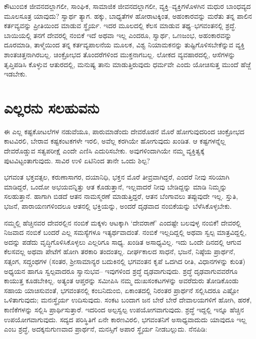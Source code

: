 ಕೌಟುಂಬಿಕ ಜೀವನದಲ್ಲಾಗಲೀ, ಸಾಂಘಿಕ, ಸಾಮಾಜಿಕ ಜೀವನದಲ್ಲಾಗಲೀ, ವ್ಯಕ್ತಿ–ವ್ಯಕ್ತಿಗ\-ಳೊಳಗಿನ ಮಧುರ ಬಾಂಧವ್ಯದ ಮೂಲಸೂತ್ರ ಯಾವುದು? ಸ್ವಾರ್ಥ ತ್ಯಾಗ. ಹಕ್ಕು, ಬಾಧ್ಯತೆಗಳ ಹೋರಾಟಕ್ಕಿಂತ, ಅಹಂಕಾರವನ್ನು ಮರೆತು ತನ್ನ ಪಾಲಿನ ಕರ್ತವ್ಯವನ್ನು ಪ್ರೀತಿಯಿಂದ ಮಾಡುವ ಸ್ಥೈರ್ಯ. ಇದರ ಮೂಲದಲ್ಲಿ ಕೆಲಸ ಮಾಡುವ ತಥ್ಯ–ಭಗವಂತನಲ್ಲಿ ಶ್ರದ್ಧೆ. ಬಾಯಿಯಲ್ಲಿ ತನಗೆ ದೇವರಲ್ಲಿ ನಂಬಿಕೆ ಇದೆ ಅಥವಾ ಇಲ್ಲ ಎಂದರೂ, ಸ್ವಾರ್ಥ, ಒಣಜಂಭ, ಅಹಂಕಾರವನ್ನು ದೂರಮಾಡಿ, ತಾಳ್ಮೆಯಿಂದ ತನ್ನ ಕರ್ತವ್ಯಪಾಲನೆಯ ಮೂಲಕ, ವಿಶ್ವ ನಿಯಾಮಕನನ್ನು ತುಷ್ಟಿಗೊಳಿಸಬೇಕೆನ್ನುವ ವ್ಯಕ್ತಿ ಶಾಂತಚಿತ್ತನಾಗಿರಬಲ್ಲ. ಚಿಂಕ್ರೋಭದ ತೊಂದರೆಗಳಿಂದ ಮುಕ್ತನಾಗಬಲ್ಲ. ಲೋಕದ ವ್ಯವಹಾರದಲ್ಲಿ, ಆಸೆಗಳನ್ನು ತೃಪ್ತಿಪಡಿಸಿ ಕೊಳ್ಳುವ ಆತುರದಲ್ಲಿ, ಮನುಷ್ಯ ತಾನು ಮಾಡುತ್ತಿರುವುದು ಧರ್ಮವೇ ಎಂದು ಯೋಚಿಸುತ್ತ ಮುಂದೆ ಹೆಜ್ಜೆ ಇಡಬೇಕು.


\section*{ಎಲ್ಲರನು ಸಲಹುವನು}

\vskip -7pt

ಈ ಎಲ್ಲ ಕಷ್ಟಕೋಟಲೆಗಳ ನಡುವೆಯೂ, ಪಾರುಮಾಡೆಂದು ದೇವರೊಡನೆ ಮೊರೆ ಹೋಗುವುದರಿಂದ ಚಿಂಕ್ರೋಭದ ಕಾಟವಿರಲಿ, ಬೇರಾವ ಕಷ್ಟಕಂಟಕಗಳೇ ಇರಲಿ, ಅವೆಲ್ಲ ಕರಗಿಯೇ ಹೋಗುವುದು ಖಂಡಿತ. ಆ ಕಷ್ಟಗಳನ್ನೆಲ್ಲ ದೇವರೊಡ್ಡುವ ಸತ್ವಪರೀಕ್ಷೆ ಎಂದೇ ಎಣಿಸಿ ಎದುರಿಸಬೇಕು. ಅವುಗಳಿಂದಾಗಿಯೇ ನಮ್ಮ ವ್ಯಕ್ತಿತ್ವಕ್ಕೆ ಪುಟವಿಟ್ಟಂತಾಗುವುದು. ಸಾವಿರ ಉಳಿ ಏಟಿನಿಂದ ತಾನೇ ಒಂದು ಶಿಲ್ಪ?

ಭಗವಂತ ಭಕ್ತವತ್ಸಲ, ಕರುಣಾಸಾಗರ, ದಯಾನಿಧಿ, ಭಕ್ತನ ಮೊರೆ ತೀವ್ರವಾಗಿದ್ದರೆ, ಎಂದರೆ ನೀವು ಸರಿಯಾಗಿ  ಮಾಡಿದ್ದರೆ, ಒಂದೋ ಅಭಯವನ್ನಿತ್ತು ಆತ  ಕೊಡುತ್ತಾನೆ, ಇಲ್ಲವಾದರೆ ನೀವು ಬೇಡಿದ್ದನ್ನು  ಮಾಡಿ ನಿಮ್ಮನ್ನು ಸಲಹುತ್ತಾನೆ. ಹಾಗಾಗಿ ಬಿಡದೆ ಆತನ ನಾಮಸ್ಮರಣೆ ಮಾಡುತ್ತಿದ್ದರೆ, ಆತನ ಬೆಂಗಾವಲು ತಪ್ಪುವುದೇ ಇಲ್ಲ. ಸ್ತುತಿ, ಭಜನೆ, ಪಾರಾಯಣಗಳಿಂದಲೂ ಆತನಲ್ಲಿ ಭಕ್ತಿಯನ್ನು, ಅಂದರೆ ದೃಢವಾದ ನಂಬಿಕೆಯನ್ನು ಬೆಳೆಸಿಕೊಳ್ಳಬೇಕು.

ನಮ್ಮಲ್ಲಿ ಹೆಚ್ಚಿನವರ ದೇವರಲ್ಲಿನ ನಂಬಿಕೆ ಮಕ್ಕಳು ಆಟಕ್ಕಾಗಿ ‘ದೇವರಾಣೆ’ ಎಂದಷ್ಟೇ ಬಲವುಳ್ಳ ನಂಬಿಕೆ! ದೇವರಲ್ಲಿ ನಿಜವಾದ ನಂಬಿಕೆ ಬಂದರೆ ಎಲ್ಲ ಸಮಸ್ಯೆಗಳೂ ಇತ್ಯರ್ಥ\-ವಾದಂತೆ. ನಂಬಿಕೆ ಇಲ್ಲದಿದ್ದಲ್ಲಿ ಅಥವಾ ಸ್ವಲ್ಪ ಮಾತ್ರವಿದ್ದಲ್ಲಿ, ಅದನ್ನು ಪಡೆದು ವೃದ್ಧಿಗೊಳಿಸಿಕೊಳ್ಳಲು ಎಲ್ಲರಿಗೂ ಸಾಧ್ಯ. ಖಂಡಿತ ಅಸಾಧ್ಯವಿಲ್ಲ. ಇದು ಒಂದೇ ದಿನದಲ್ಲಿ ಆಗುವ ಕೆಲಸವಲ್ಲ ಅಥವಾ ಪೇಟೆಗೆ ಹೋಗಿ ತರಕಾರಿ ತಂದಂತಲ್ಲ. ದೀರ್ಘಕಾಲದ ಸಾಧನೆ, ಭಜನೆ, ನಿಷ್ಠೆಯ ಪ್ರಾರ್ಥನೆ, ಸತ್ಸಂಗ, ಸದ್ಗ್ರಂಥಗಳ (ಸಂತರ, ಶ‍್ರೀಸಾಮಾನ್ಯರ ಬದುಕಿನಲ್ಲಿ ಭಗವಂತನ ಕೃಪೆ ಒದಗಿದ ರೀತಿ, ವಿಧಾನಗಳನ್ನು ಕುರಿತ) ಅಧ್ಯಯನ ಹಾಗೂ ಸ್ವಲ್ಪವಾದರೂ ಸ್ವಾನುಭವ– ಇವುಗಳಿಂದ ಶ್ರದ್ಧೆ ದೃಢವಾಗುವುದು. ಶ್ರದ್ಧೆ ದೃಢವಾಗುವವರೆಗೂ ಕಾಯುತ್ತ ಕೂಡಬೇಕಿಲ್ಲ. ಅತ್ಯಂತ ಆಪ್ತರನ್ನು ಸಮೀಪಿಸಿ ನಮ್ಮ ದುಃಖಸಂಕಟಗಳನ್ನು ಅವರೆದುರು ತೋಡಿಕೊಂಡು ಸಹಾಯ ಯಾಚಿಸುವಂತೆ, ಭಗವಂತನಲ್ಲಿ ಕಂಬನಿದುಂಬಿ, ಏಕಾಂತದಲ್ಲಿ ನಿರಂತರ ಪ್ರಾರ್ಥನೆ ಸಲ್ಲಿಸಿದರೂ ಎಷ್ಟೋ ಒಳಿತಾಗುವುದು; ಮನಃಸ್ಥೈರ್ಯ ಉದಿಸುವುದು. ಸಂಕಟ ಬಂದಾಗ ಜನ ಬೇರೆ ಬೇರೆ ದೇವಾಲಯಗಳಿಗೆ ಹೋಗಿ, ಹರಕೆ, ಕಾಣಿಕೆಗಳನ್ನು ಸಲ್ಲಿಸಿ ಪ್ರಾರ್ಥಿಸುತ್ತಾರೆ. ಇದರಿಂದ ಅಲ್ಪಸ್ವಲ್ಪ ಉಪಯೋಗವಾಗುವುದು. ಶ್ರದ್ಧೆ ಇದ್ದಲ್ಲಿ ಇನ್ನೂ ಹೆಚ್ಚಿನ ಉಪಯೋಗವಾಗುವುದು. ಸದ್ಯದ ಪರಿಸ್ಥಿತಿಗೆ ಏನೇ ಕಾರಣವಿರಲಿ, ಭಗವಂತನಿಗೆ ಅಸಾಧ್ಯವಾದುದು ಯಾವುದೂ ಇಲ್ಲ ಎಂಬ ಶ್ರದ್ಧೆ, ಅದಕ್ಕನುಗುಣವಾದ ಪ್ರಾರ್ಥನೆ, ಮನಸ್ಸಿಗೆ ಅಪಾರ ಸ್ಥೈರ್ಯ ನೀಡಬಲ್ಲುದು. ನೆನಪಿಡಿ:

